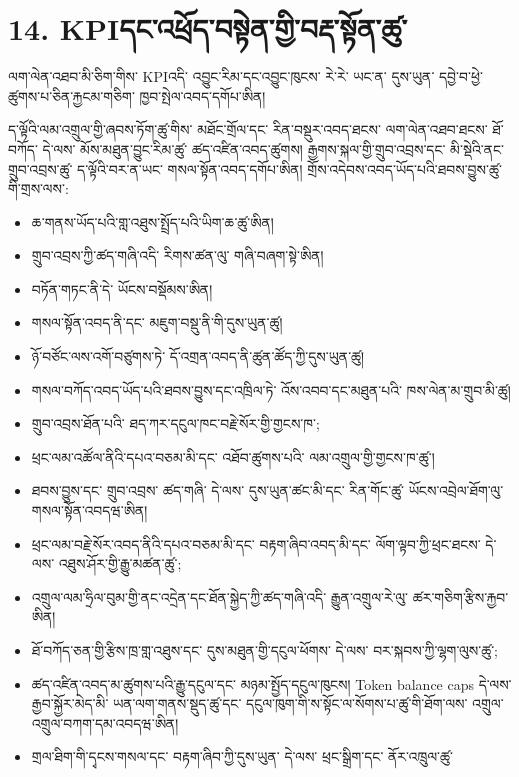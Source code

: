 \documentclass[11pt]{article}
\begin{document}
\section*{14. KPIདང་འཕྲོད་བསྟེན་གྱི་བརྡ་སྟོན་ཚུ་}

ལག་ལེན་འཐབ་མི་ཅིག་གིས་ KPIའདི་ འབྱུང་རིམ་དང་འབྱུང་ཁུངས་ རེ་རེ་ ཡང་ན་ དུས་ཡུན་ དབྱེ་བ་ཕྱེ་ཚུགས་པ་ཅིན་རྐྱངམ་གཅིག་ ཁྱབ་སྤེལ་འབད་དགོཔ་ཨིན།

ད་ལྟོའི་ལམ་འགྲུལ་གྱི་ཞབས་ཏོག་ཚུ་གིས་ མཐོང་གྲོལ་དང་ རིན་བསྡུར་འབད་ཐངས་ ལག་ལེན་འཐབ་ཐངས་ ཐོ་བཀོད་ དེ་ལས་ མོས་མཐུན་བྱུང་རིམ་ཚུ་ ཚད་འཛིན་འབད་ཚུགས། རྒྱགས་སྐལ་གྱི་གྲུབ་འབྲས་དང་ མི་སྡེའི་ནང་ གྲུབ་འབྲས་ཚུ་ ད་ལྟོའི་བར་ན་ཡང་ གསལ་སྟོན་འབད་དགོཔ་ཨིན། གྲོས་འདེབས་འབད་ཡོད་པའི་ཐབས་བྱུས་ཚུ་གི་གྲས་ལས་:

\begin{itemize}[leftmargin=*]
\item ཆ་གནས་ཡོད་པའི་གླ་འཐུས་སྤྲོད་པའི་ཡིག་ཆ་ཚུ་ཨིན།
\item གྲུབ་འབྲས་ཀྱི་ཚད་གཞི་འདི་ རིགས་ཚན་ལུ་ གཞི་བཞག་སྟེ་ཨིན།
\item བཏོན་གཏང་ནི་དེ་ ཡོངས་བསྡོམས་ཨིན།
\item གསལ་སྟོན་འབད་ནི་དང་ མཇུག་བསྡུ་ནི་གི་དུས་ཡུན་ཚུ།
\item ཉོ་བཙོང་ལས་འགོ་བཙུགས་ཏེ་ དོ་འགྲན་འབད་ནི་ཚུན་ཚོད་ཀྱི་དུས་ཡུན་ཚུ།
\item གསལ་བཀོད་འབད་ཡོད་པའི་ཐབས་བྱུས་དང་འཁྲིལ་ཏེ་ འོས་འབབ་དང་མཐུན་པའི་ ཁས་ལེན་མ་གྲུབ་མི་ཚུ།
\item གྲུབ་འབྲས་ཐོན་པའི་ ཐད་ཀར་དངུལ་ཁང་བརྗེ་སོར་གྱི་གྱངས་ཁ་;
\item ཕྲང་ལམ་འཚོལ་ནིའི་དཔའ་བཅམ་མི་དང་ འཐོབ་ཚུགས་པའི་ ལམ་འགྲུལ་གྱི་གྱངས་ཁ་ཚུ་།
\item ཐབས་བྱུས་དང་ གྲུབ་འབྲས་ ཚད་གཞི་ དེ་ལས་ དུས་ཡུན་ཚང་མི་དང་ རིན་གོང་ཚུ་ ཡོངས་འབྲེལ་ཐོག་ལུ་ གསལ་སྟོན་འབདཝ་ཨིན།
\item ཕྲང་ལམ་བརྗེ་སོར་འབད་ནིའི་དཔའ་བཅམ་མི་དང་ བརྟག་ཞིབ་འབད་མི་དང་ ལོག་ལྟབ་ཀྱི་ཕྲང་ཐངས་ དེ་ལས་ འཐུས་ཤོར་གྱི་རྒྱུ་མཚན་ཚུ་;
\item འགྲུལ་ལམ་ཧྲིལ་བུམ་གྱི་ནང་འདྲེན་དང་ཐོན་སྐྱེད་ཀྱི་ཚད་གཞི་འདི་ རྒྱུན་འགྲུལ་རེ་ལུ་ ཚར་གཅིག་རྩིས་རྐྱབ་ཨིན།
\item ཐོ་བཀོད་ཅན་གྱི་རྩིས་ཁྲ་གླ་འཐུས་དང་ དུས་མཐུན་གྱི་དངུལ་ཕོགས་ དེ་ལས་ བར་སྐབས་ཀྱི་ལྷག་ལུས་ཚུ་;
\item ཚད་འཛིན་འབད་མ་ཚུགས་པའི་རྒྱུ་དངུལ་དང་ མཉམ་སྤྱོད་དངུལ་ཁུངས། Token balance caps དེ་ལས་ རྒྱབ་སྐྱོར་མེད་མི་ ཡན་ལག་གནས་སྡུད་ཚུ་དང་ དངུལ་ཁུག་གི་ས་སྟོང་ལ་སོགས་པ་ཚུ་གི་ཐོག་ལས་ འགྲུལ་འགྲུལ་བཀག་དམ་འབདཝ་ཨིན།
\item གྲལ་ཐིག་གི་དྭངས་གསལ་དང་ བརྟག་ཞིབ་ཀྱི་དུས་ཡུན་ དེ་ལས་ ཕྲང་སྒྲིག་དང་ ནོར་འཁྲུལ་ཚུ་

\end{itemize}
\end{document}
